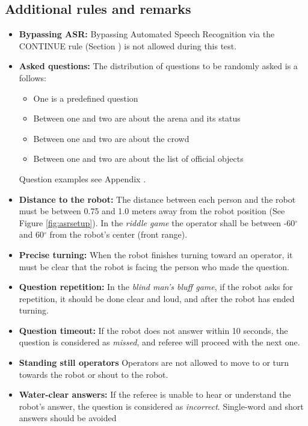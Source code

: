 \subsection{Additional rules and remarks}

\begin{itemize}
    \item \textbf{Bypassing ASR:} Bypassing Automated Speech Recognition via the CONTINUE rule (Section ) is not allowed during this test.
    \item \textbf{Asked questions:} The distribution of questions to be randomly asked is a follows:
    \begin{itemize}
        \item One is a predefined question
        \item Between one and two are about the arena and its status
        \item Between one and two are about the crowd
        \item Between one and two are about the list of official objects
    \end{itemize}
    Question examples see Appendix .
    \item \textbf{Distance to the robot:} The distance between each person and the robot must be between 0.75 and 1.0 meters away from the robot position (See Figure \ref{fig:asrsetup}). In the \textit{riddle game} the operator shall be between -60$^{\circ}$ and 60$^{\circ}$ from the robot's center (front range).
    \item \textbf{Precise turning:} When the robot finishes turning toward an operator, it must be clear that the robot is facing the person who made the question.
    \item \textbf{Question repetition:} In the \textit{blind man's bluff game}, if the robot asks for repetition, it should be done clear and loud, and after the robot has ended turning.
    \item \textbf{Question timeout:} If the robot does not answer within 10 seconds, the question is considered as \textit{missed}, and referee will proceed with the next one.
    \item \textbf{Standing still operators} Operators are not allowed to move to or turn towards the robot or shout to the robot.
    \item \textbf{Water-clear answers:} If the referee is unable to hear or understand the robot's answer, the question is considered as \textit{incorrect}. Single-word and short answers should be avoided
\end{itemize}

